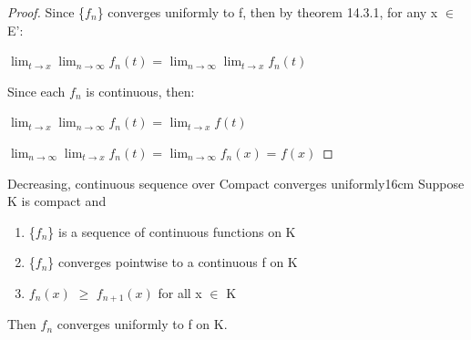     \vspace{0.1cm}
    
    \begin{proof}
        Since \{$f_n$\} converges uniformly to f, then by {\color{red} theorem 14.3.1},
        for any x $\in$ E':

        \hspace{0.5cm}
        $\lim_{t \rightarrow x} \lim_{n \rightarrow \infty} f_n(t)$
        = $\lim_{n \rightarrow \infty} \lim_{t \rightarrow x} f_n(t)$

        Since each $f_n$ is continuous, then:

        \hspace{0.5cm}
        $\lim_{t \rightarrow x} \lim_{n \rightarrow \infty} f_n(t)$
        = $\lim_{t \rightarrow x} f(t)$

        \hspace{0.5cm}
        $\lim_{n \rightarrow \infty} \lim_{t \rightarrow x} f_n(t)$
        = $\lim_{n \rightarrow \infty} f_n(x)$ = $f(x)$
    \end{proof}

    \newpage



    \begin{wtheorem}{Decreasing, continuous sequence over Compact
    converges uniformly}{16cm}
        Suppose K is compact and

        \begin{enumerate}[label=(\alph*), leftmargin=1.5cm, itemsep=0.1cm]
            \item \{$f_n$\} is a sequence of continuous functions on K
            
            \item \{$f_n$\} converges pointwise to a continuous f on K
            
            \item $f_n(x)$ $\geq$ $f_{n+1}(x)$ for all x $\in$ K
        \end{enumerate}

        Then $f_n$ converges uniformly to f on K.    
    \end{wtheorem}


